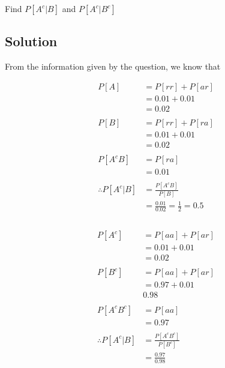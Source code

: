 \documentclass[12pt]{report} %
\begin{document}
\noindent Find $P[{A}^{c}|B]$ and $P[{A}^{c}|{B}^{c}]$

\subsection*{Solution}

From the information given by the question, we know that

\begin{multicols}{2} \notag

\begin{align}
P[A] & = P[rr] + P[ar] \\
& = 0.01 + 0.01 \\
& = 0.02 \\
\\
P[B] & = P[rr] + P[ra] \\
& = 0.01 + 0.01 \\
& = 0.02 \\
\\
P[{A}^{c}B] & = P[ra] \\
& = 0.01 \\
\\
\therefore P[{A}^{c}|{B}] & = \frac{P[{A}^{c}B]}{P[B]} \\
& = \frac{0.01}{0.02} = \frac{1}{2} = 0.5 \\
\\
\end{align}

\columnbreak

\begin{align}
P[{A}^{c}] & = P[aa] + P[ar] \\
& = 0.01 + 0.01 \\
& = 0.02 \\
\\
P[{B}^{c}] & = P[aa] + P[ar] \\
& = 0.97 + 0.01 \\
& 0.98 \\
\\
P[{A}^{c}{B}^{c}] & = P[aa] \\
& = 0.97 \\
\\
\therefore P[{A}^{c}|{B}] & = \frac{P[{A}^{c}{B}^{c}]}{P[{B}^{c}]} \\
& = \frac{0.97}{0.98} \\
\\
\end{align}

\end{multicols}
\end{document}
